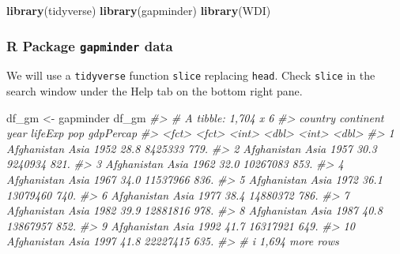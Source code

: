 \documentclass[
  xelatex, ja=standard]{bxjsbook}
\newenvironment{Shaded}{\begin{snugshade}}{\end{snugshade}}
\newcommand{\CommentTok}[1]{\textcolor[rgb]{0.56,0.35,0.01}{\textit{#1}}}
\newcommand{\FunctionTok}[1]{\textcolor[rgb]{0.13,0.29,0.53}{\textbf{#1}}}
\newcommand{\NormalTok}[1]{#1}
\newcommand{\OtherTok}[1]{\textcolor[rgb]{0.56,0.35,0.01}{#1}}
\theoremstyle{definition}
\theoremstyle{definition}
\theoremstyle{definition}
\theoremstyle{definition}
\theoremstyle{remark}
\begin{document}
\begin{Shaded}
\begin{Highlighting}[]
\FunctionTok{library}\NormalTok{(tidyverse)}
\FunctionTok{library}\NormalTok{(gapminder)}
\FunctionTok{library}\NormalTok{(WDI)}
\end{Highlighting}
\end{Shaded}

\hypertarget{r-package-gapminder-data}{%
\subsubsection{\texorpdfstring{R Package \texttt{gapminder} data}{R Package gapminder data}}\label{r-package-gapminder-data}}

We will use a \texttt{tidyverse} function \texttt{slice} replacing \texttt{head}. Check \texttt{slice} in the search window under the Help tab on the bottom right pane.

\begin{Shaded}
\begin{Highlighting}[]
\NormalTok{df\_gm }\OtherTok{\textless{}{-}}\NormalTok{ gapminder}
\NormalTok{df\_gm}
\CommentTok{\#\textgreater{} \# A tibble: 1,704 x 6}
\CommentTok{\#\textgreater{}    country     continent  year lifeExp      pop gdpPercap}
\CommentTok{\#\textgreater{}    \textless{}fct\textgreater{}       \textless{}fct\textgreater{}     \textless{}int\textgreater{}   \textless{}dbl\textgreater{}    \textless{}int\textgreater{}     \textless{}dbl\textgreater{}}
\CommentTok{\#\textgreater{}  1 Afghanistan Asia       1952    28.8  8425333      779.}
\CommentTok{\#\textgreater{}  2 Afghanistan Asia       1957    30.3  9240934      821.}
\CommentTok{\#\textgreater{}  3 Afghanistan Asia       1962    32.0 10267083      853.}
\CommentTok{\#\textgreater{}  4 Afghanistan Asia       1967    34.0 11537966      836.}
\CommentTok{\#\textgreater{}  5 Afghanistan Asia       1972    36.1 13079460      740.}
\CommentTok{\#\textgreater{}  6 Afghanistan Asia       1977    38.4 14880372      786.}
\CommentTok{\#\textgreater{}  7 Afghanistan Asia       1982    39.9 12881816      978.}
\CommentTok{\#\textgreater{}  8 Afghanistan Asia       1987    40.8 13867957      852.}
\CommentTok{\#\textgreater{}  9 Afghanistan Asia       1992    41.7 16317921      649.}
\CommentTok{\#\textgreater{} 10 Afghanistan Asia       1997    41.8 22227415      635.}
\CommentTok{\#\textgreater{} \# i 1,694 more rows}
\end{Highlighting}
\end{Shaded}
\end{document}
